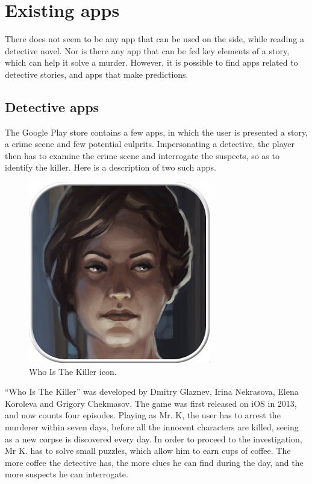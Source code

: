 \documentclass{mproj}
\begin{document}
\section{Existing apps}

There does not seem to be any app that can be used on the side, while reading a detective novel. Nor is there any app that can be fed key elements of a story, which can help it solve a murder. However, it is possible to find apps related to detective stories, and apps that make predictions.

\subsection*{Detective apps}

The Google Play store contains a few apps, in which the user is presented a story, a crime scene and few potential culprits. Impersonating a detective, the player then has to examine the crime scene and interrogate the suspects, so as to identify the killer. Here is a description of two such apps. \par

\begin{figure}
	\vspace{-10pt}
	\centering
	\includegraphics[scale=0.25]{images/whoisthekiller_icon}
	\caption{Who Is The Killer icon.}
	\vspace{-25pt}
\end{figure}

``Who Is The Killer'' \cite{whoisthekiller} was developed by Dmitry Glaznev, Irina Nekrasova, Elena Koroleva and Grigory Chekmasov. The game was first released on iOS in 2013, and now counts four episodes. Playing as Mr. K, the user has to arrest the murderer within seven days, before all the innocent characters are killed, seeing as a new corpse is discovered every day. In order to proceed to the investigation, Mr K. has to solve small puzzles, which allow him to earn cups of coffee. The more coffee the detective has, the more clues he can find during the day, and the more suspects he can interrogate. \par
\end{document}
